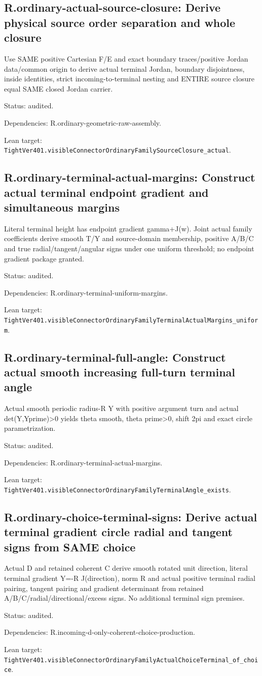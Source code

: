 \documentclass{article}
\begin{document}
\subsection*{R.ordinary-actual-source-closure: Derive physical source order separation and whole closure}
Use SAME positive Cartesian F/E and exact boundary traces/positive Jordan data/common origin to derive actual terminal Jordan, boundary disjointness, inside identities, strict incoming-to-terminal nesting and ENTIRE source closure equal SAME closed Jordan carrier.
\par Status: audited.
\par Dependencies: R.ordinary-geometric-raw-assembly.
\par Lean target: \texttt{TightVer401.visibleConnectorOrdinaryFamilySourceClosure\_actual}.
\subsection*{R.ordinary-terminal-actual-margins: Construct actual terminal endpoint gradient and simultaneous margins}
Literal terminal height has endpoint gradient gamma+J(w). Joint actual family coefficients derive smooth T/Y and source-domain membership, positive A/B/C and true radial/tangent/angular signs under one uniform threshold; no endpoint gradient package granted.
\par Status: audited.
\par Dependencies: R.ordinary-terminal-uniform-margins.
\par Lean target: \texttt{TightVer401.visibleConnectorOrdinaryFamilyTerminalActualMargins\_uniform}.
\subsection*{R.ordinary-terminal-full-angle: Construct actual smooth increasing full-turn terminal angle}
Actual smooth periodic radius-R Y with positive argument turn and actual det(Y,Yprime)>0 yields theta smooth, theta prime>0, shift 2pi and exact circle parametrization.
\par Status: audited.
\par Dependencies: R.ordinary-terminal-actual-margins.
\par Lean target: \texttt{TightVer401.visibleConnectorOrdinaryFamilyTerminalAngle\_exists}.
\subsection*{R.ordinary-choice-terminal-signs: Derive actual terminal gradient circle radial and tangent signs from SAME choice}
Actual D and retained coherent C derive smooth rotated unit direction, literal terminal gradient Y=-R J(direction), norm R and actual positive terminal radial pairing, tangent pairing and gradient determinant from retained A/B/C/radial/directional/excess signs. No additional terminal sign premises.
\par Status: audited.
\par Dependencies: R.incoming-d-only-coherent-choice-production.
\par Lean target: \texttt{TightVer401.visibleConnectorOrdinaryFamilyActualChoiceTerminal\_of\_choice}.
\end{document}
